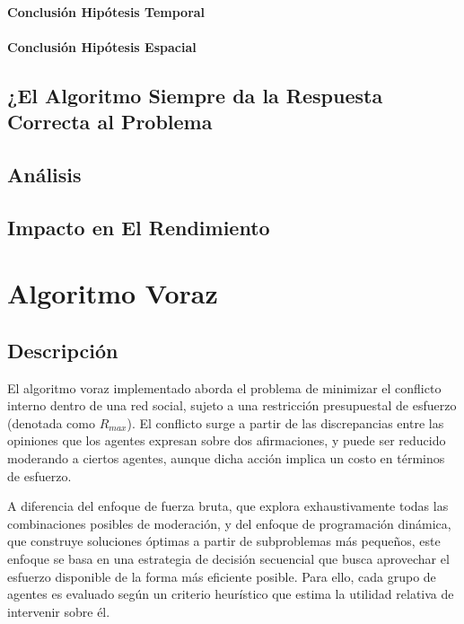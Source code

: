 \documentclass[11pt,letter]{article}
\begin{document}
\begin{itemize}
        \paragraph{Conclusión Hipótesis Temporal}

        \paragraph{Conclusión Hipótesis Espacial}

        \subsection{¿El Algoritmo Siempre da la Respuesta Correcta al Problema}

        \subsection{Análisis}

        \subsection{Impacto en El Rendimiento}

    \end{itemize}


    \newpage



    \section{Algoritmo Voraz}

    \subsection{Descripción}
    El algoritmo voraz implementado aborda el problema de minimizar el conflicto interno dentro de una red social, sujeto a una restricción presupuestal de esfuerzo (denotada como $R_{max}$). El conflicto surge a partir de las discrepancias entre las opiniones que los agentes expresan sobre dos afirmaciones, y puede ser reducido moderando a ciertos agentes, aunque dicha acción implica un costo en términos de esfuerzo.

    A diferencia del enfoque de fuerza bruta, que explora exhaustivamente todas las combinaciones posibles de moderación, y del enfoque de programación dinámica, que construye soluciones óptimas a partir de subproblemas más pequeños, este enfoque se basa en una estrategia de decisión secuencial que busca aprovechar el esfuerzo disponible de la forma más eficiente posible. Para ello, cada grupo de agentes es evaluado según un criterio heurístico que estima la utilidad relativa de intervenir sobre él.
\end{document}
